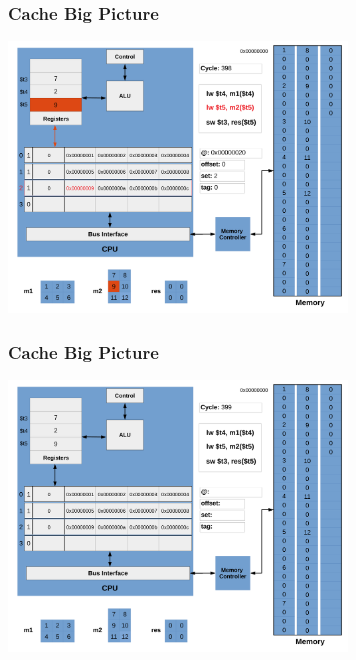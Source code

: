 \documentclass{beamer}
\begin{document}
\begin{frame}[fragile]
\frametitle{Cache Big Picture}

\begin{center}
\vspace*{-0.23cm}
\hspace*{-1cm}\includegraphics[width=9cm]{cache27.pdf}
\end{center}

\end{frame}

\begin{frame}[fragile]
\frametitle{Cache Big Picture}

\begin{center}
\vspace*{-0.23cm}
\hspace*{-1cm}\includegraphics[width=9cm]{cache28.pdf}
\end{center}

\end{frame}
\end{document}
